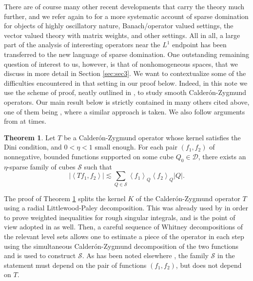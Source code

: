 \documentclass[12pt]{amsart}
\newcommand{\Ss}{\mathcal{S}}
\newcommand{\D}{\mathscr{D}}
\theoremstyle{plain}
\theoremstyle{definition} %
\numberwithin{equation}{section}
\newtheorem{ltheorem}{Theorem}
\begin{document}
There are of course many other recent developments that carry the theory much further, and we refer again to \cite{Pe2019} for a more systematic account of sparse domination for objects of highly oscillatory nature, Banach/operator valued settings, the vector valued theory with matrix weights, and other settings. All in all, a large part of the analysis of interesting operators near the $L^1$ endpoint has been transferred to the new language of sparse domination. One outstanding remaining question of interest to us, however, is that of nonhomogeneous spaces, that we discuss in more detail in Section \ref{sec:sec3}. We want to contextualize some of the difficulties encountered in that setting in our proof below. Indeed, in this note we use the scheme of proof, neatly outlined in \cite{CuDPOu2018}, to study smooth Calder\'on-Zygmund operators. Our main result below is strictly contained in many others cited above, one of them being \cite{CACDPO2017}, where a similar approach is taken. We also follow arguments from \cite{BRS2024} at times.

\begin{ltheorem}\label{theoremA}
Let $T$ be a Calder\'on-Zygmund operator whose kernel satisfies the Dini condition, and $0<\eta<1$ small enough. For each pair $(f_1, f_2)$ of nonnegative, bounded functions supported on some cube $Q_0\in \D$, there exists an $\eta$-sparse family of cubes $\Ss$ such that
\[
\left|\left\langle T f_1, f_2\right\rangle\right| \lesssim \sum_{Q \in \Ss}\left\langle f_1\right\rangle_Q\left\langle f_2\right\rangle_Q|Q|.
\]    
\end{ltheorem}

The proof of Theorem \ref{theoremA} splits the kernel $K$ of the Calder\'on-Zygmund operator $T$ using a radial Littlewood-Paley decomposition. This was already used by \cite{HRT2017} in order to prove weighted inequalities for rough singular integrals, and is the point of view adopted in \cite{CACDPO2017} as well. Then, a careful sequence of Whitney decompositions of the relevant level sets allows one to estimate a piece of the operator in each step using the simultaneous Calder\'on-Zygmund decomposition of the two functions and is used to construct $\Ss$. As has been noted elsewhere \cite{LaMe2017}, the family $\Ss$ in the statement must depend on the pair of functions $(f_1,f_2)$, but does not depend on $T$. 
\end{document}
